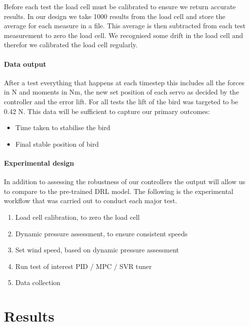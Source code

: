    Before each test the load cell must be calibrated to ensure we return
    accurate results. In our design we take 1000 results from the load cell
    and store the average for each measure in a file. This average is then
    subtracted from each test measurement to zero the load cell. We recognised
    some drift in the load cell and therefor we calibrated the load cell regularly.

    \paragraph{Data output}
    After a test everything that happens at each timestep this includes all the
    forces in N and moments in Nm, the new set position of each servo as decided by
    the controller and the error lift. For all tests the lift of the bird was
    targeted to be 0.42 N. This data will be sufficient to capture our primary outcomes:

    \begin{itemize}
        \item Time taken to stabilise the bird
        \item Final stable position of bird
    \end{itemize}

    \paragraph{Experimental design} In addition to assessing the robustness of our controllers the output will
    allow us to compare to the pre-trained DRL model.
    The following is the experimental workflow that was carried out to conduct each major test.

    \begin{enumerate}
        \item Load cell calibration, to zero the load cell
        \item Dynamic pressure assessment, to ensure consistent speeds
        \item Set wind speed, based on dynamic pressure assessment
        \item Run test of interest PID / MPC / SVR tuner
        \item Data collection
    \end{enumerate}

\section{Results}

